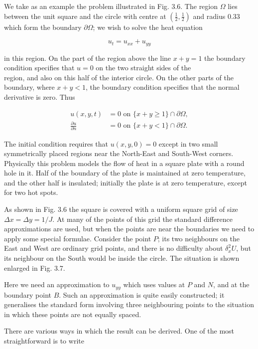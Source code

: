 \documentclass[10pt]{article}
\begin{document}
We take as an example the problem illustrated in Fig. 3.6. The region \(\Omega\) lies between the unit square and the circle with centre at \(\left(\frac{1}{2}, \frac{1}{2}\right)\) and radius 0.33 which form the boundary \(\partial \Omega\); we wish to solve the heat equation

\[
u_{t}=u_{x x}+u_{y y}
\]

in this region. On the part of the region above the line \(x+y=1\) the boundary condition specifies that \(u=0\) on the two straight sides of the\\
region, and also on this half of the interior circle. On the other parts of the boundary, where \(x+y<1\), the boundary condition specifies that the normal derivative is zero. Thus

\[
\begin{aligned}
u(x, y, t) & =0 \text { on }\{x+y \geq 1\} \cap \partial \Omega, \\
\frac{\partial u}{\partial n} & =0 \text { on }\{x+y<1\} \cap \partial \Omega .
\end{aligned}
\]

The initial condition requires that \(u(x, y, 0)=0\) except in two small symmetrically placed regions near the North-East and South-West corners. Physically this problem models the flow of heat in a square plate with a round hole in it. Half of the boundary of the plate is maintained at zero temperature, and the other half is insulated; initially the plate is at zero temperature, except for two hot spots.

As shown in Fig. 3.6 the square is covered with a uniform square grid of size \(\Delta x=\Delta y=1 / J\). At many of the points of this grid the standard difference approximations are used, but when the points are near the boundaries we need to apply some special formulae. Consider the point \(P\); its two neighbours on the East and West are ordinary grid points, and there is no difficulty about \(\delta_{x}^{2} U\), but its neighbour on the South would be inside the circle. The situation is shown enlarged in Fig. 3.7.

Here we need an approximation to \(u_{y y}\) which uses values at \(P\) and \(N\), and at the boundary point \(B\). Such an approximation is quite easily constructed; it generalises the standard form involving three neighbouring points to the situation in which these points are not equally spaced.

There are various ways in which the result can be derived. One of the most straightforward is to write
\end{document}
